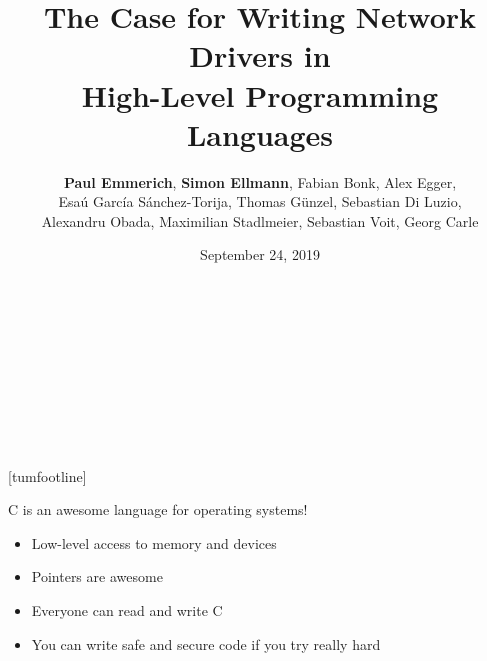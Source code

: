 \documentclass[NET,english,aspectratio=169,notitleframe]{tumbeamer}
\author[Paul Emmerich, Simon Ellmann]{\textbf{Paul Emmerich}, \textbf{Simon Ellmann}, Fabian Bonk, Alex Egger,\\ Esaú García Sánchez-Torija, Thomas Günzel, Sebastian Di Luzio,\\Alexandru Obada, Maximilian Stadlmeier, Sebastian Voit, Georg Carle}
\title{The Case for Writing Network Drivers in\\ High-Level Programming Languages}
\date{September 24, 2019}
\begin{document}
  \begin{frame}[c,noframenumbering]
  \centering%
  \Large%
  \strut\textcolor{TUMBlue}{\inserttitle}%
  \\[4ex]%
  \normalsize%
\footnotesize  \strut\insertauthor%
  \\[2ex]%
  \footnotesize%
  \insertdate%
  \\[4ex]%
  \ifdefined\departmentname%
    \ifdefined\chairname%
      \chairname\\%
    \fi%
    \departmentname\\%
  \fi%
  \TUMname\\%
\end{frame}
[tumfootline]

\begin{frame}{C is an awesome language for operating systems!}
\begin{itemize}
\item Low-level access to memory and devices
\item Pointers are awesome
\item Everyone can read and write C
\item You can write safe and secure code if you try really hard
\end{itemize}
\end{frame}
\end{document}
